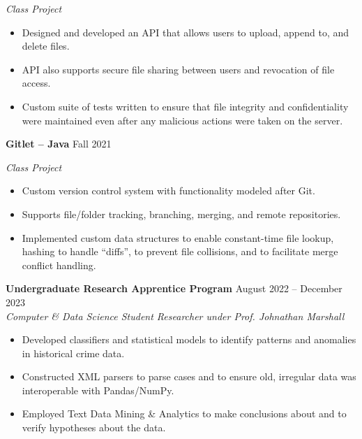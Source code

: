 \documentclass{article}
\begin{document}
\begin{adjustwidth}{1em}{1em}
    \textit{Class Project}
    \begin{itemize}
        \item Designed and developed an API that allows users to upload, append to, and delete files.
        \item API also supports secure file sharing between users and revocation of file access.
        \item Custom suite of tests written to ensure that file integrity and confidentiality were maintained even after any malicious actions were taken on the server.
    \end{itemize}

    \vspace{1mm}

    \textbf{Gitlet -- Java} \hfill Fall 2021

    \textit{Class Project}
    \begin{itemize}
        \item Custom version control system with functionality modeled after Git.
        \item Supports file/folder tracking, branching, merging, and remote repositories.
        \item Implemented custom data structures to enable constant-time file lookup, hashing to handle ``diffs'', to prevent file collisions, and to facilitate merge conflict handling.
    \end{itemize}


    


\end{adjustwidth}



\begin{adjustwidth}{1em}{1em}


    \textbf{Undergraduate Research Apprentice Program} \hfill August 2022 -- December 2023
    \\ \textit{Computer \& Data Science Student Researcher under Prof. Johnathan Marshall}
    \begin{itemize}
        \item Developed classifiers and statistical models to identify patterns and anomalies in historical crime data.
        \item Constructed XML parsers to parse cases and to ensure old, irregular data was interoperable with Pandas/NumPy.
        \item Employed Text Data Mining \& Analytics to make conclusions about and to verify hypotheses about the data.
    \end{itemize}

    \vspace{1mm}

\end{adjustwidth}



\end{document}
